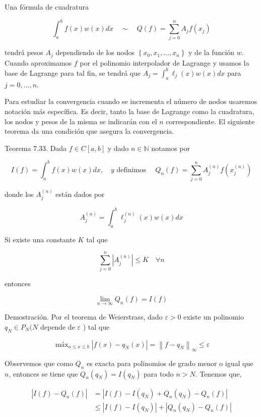 \documentclass[10pt]{book}
\begin{document}
Una fórmula de cuadratura

$$
\int_{a}^{b} f(x) w(x) d x \quad \sim \quad Q(f)=\sum_{j=0}^{n} A_{j} f\left(x_{j}\right)
$$

tendrá pesos $A_{j}$ dependiendo de los nodos $\left\{x_{0}, x_{1}, \ldots, x_{n}\right\}$ y de la función $w$.\\
Cuando aproximamos $f$ por el polinomio interpolador de Lagrange y usamos la base de Lagrange para tal fin, se tendrá que $A_{j}=\int_{a}^{b} \ell_{j}(x) w(x) d x$ para $j=0, \ldots, n$.

Para estudiar la convergencia cuando se incrementa el número de nodos usaremos notación más específica. Es decir, tanto la base de Lagrange como la cuadratura, los nodos y pesos de la misma se indicarán con el $n$ correspondiente. El siguiente teorema da una condición que asegura la convergencia.

Teorema 7.33. Dada $f \in C[a, b]$ y dado $n \in \mathbb{N}$ notamos por

$$
I(f)=\int_{a}^{b} f(x) w(x) d x, \quad y \text { definimos } \quad Q_{n}(f)=\sum_{j=0}^{n} A_{j}^{(n)} f\left(x_{j}^{(n)}\right)
$$

donde los $A_{j}^{(n)}$ están dados por

$$
A_{j}^{(n)}=\int_{a}^{b} \ell_{j}^{(n)}(x) w(x) d x
$$

Si existe una constante $K$ tal que

$$
\sum_{j=0}^{n}\left|A_{j}^{(n)}\right| \leq K \quad \forall n
$$

entonces

$$
\lim _{n \rightarrow \infty} Q_{n}(f)=I(f)
$$

Demostración. Por el teorema de Weierstrass, dado $\varepsilon>0$ existe un polinomio $q_{N} \in P_{N}(N$ depende de $\varepsilon$ ) tal que

$$
\operatorname{máx}_{a \leq x \leq b}\left|f(x)-q_{N}(x)\right|=\left\|f-q_{N}\right\|_{\infty} \leq \varepsilon
$$

Observemos que como $Q_{n}$ es exacta para polinomios de grado menor o igual que $n$, entonces se tiene que $Q_{n}\left(q_{N}\right)=I\left(q_{N}\right)$ para todo $n>N$. Tenemos que,

$$
\begin{aligned}
\left|I(f)-Q_{n}(f)\right| & =\left|I(f)-I\left(q_{N}\right)+Q_{n}\left(q_{N}\right)-Q_{n}(f)\right| \\
& \leq\left|I(f)-I\left(q_{N}\right)\right|+\left|Q_{n}\left(q_{N}\right)-Q_{n}(f)\right|
\end{aligned}
$$
\end{document}
